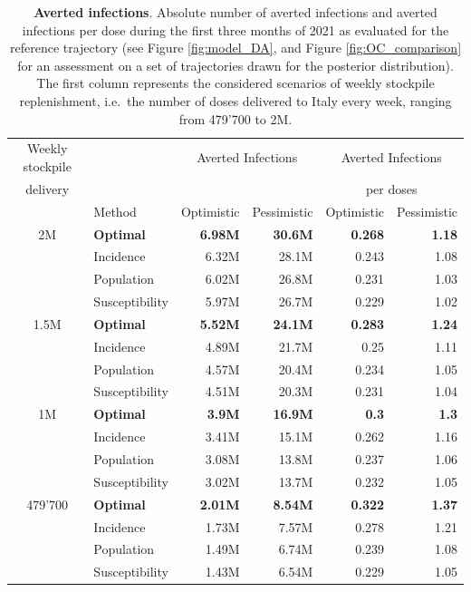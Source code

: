 \begin{table}[h!]
\centering
\begin{tabular}{clrrrr}
\toprule
Weekly stockpile& {} & \multicolumn{2}{c}{Averted Infections} & \multicolumn{2}{c}{Averted Infections} \\
delivery&    &  & & \multicolumn{2}{c}{ per doses} \\
& Method &  Optimistic & Pessimistic &     Optimistic & Pessimistic \\
\midrule
2M & \textbf{Optimal} &   \textbf{6.98M} &    \textbf{30.6M} &          \textbf{0.268} &        \textbf{1.18} \\
        & Incidence &   6.32M &    28.1M &          0.243 &        1.08 \\
        & Population &   6.02M &    26.8M &          0.231 &        1.03 \\
        & Susceptibility &   5.97M &    26.7M &          0.229 &        1.02 \\
1.5M & \textbf{Optimal} &   \textbf{5.52M} &    \textbf{24.1M} &  \textbf{        0.283} &        \textbf{1.24} \\
        & Incidence &   4.89M &    21.7M &           0.25 &        1.11 \\
        & Population &   4.57M &    20.4M &          0.234 &        1.05 \\
        & Susceptibility &   4.51M &    20.3M &          0.231 &        1.04 \\
1M & \textbf{Optimal} &    \textbf{3.9M} &    \textbf{16.9M} &            \textbf{0.3} &         \textbf{1.3} \\
        & Incidence &   3.41M &    15.1M &          0.262 &        1.16 \\
        & Population &   3.08M &    13.8M &          0.237 &        1.06 \\
        & Susceptibility &   3.02M &    13.7M &          0.232 &        1.05 \\
479'700 & \textbf{Optimal} &   \textbf{2.01M} &    \textbf{8.54M} &          \textbf{0.322} &        \textbf{1.37} \\
        & Incidence &   1.73M &    7.57M &          0.278 &        1.21 \\
        & Population &   1.49M &    6.74M &          0.239 &        1.08 \\
        & Susceptibility &   1.43M &    6.54M &          0.229 &        1.05 \\
\bottomrule
\end{tabular}
\caption{\footnotesize{\textbf{Averted infections}}. Absolute number of averted infections and averted infections per dose during the first three months of 2021 as evaluated for the reference trajectory (see Figure \ref{fig:model_DA}, and Figure \ref{fig:OC_comparison} for an assessment on a set of trajectories drawn for the posterior distribution). The first column represents the considered scenarios of weekly stockpile replenishment, i.e.~the number of doses delivered to Italy every week, ranging from 479'700 to 2M.}
\label{table:averted_abs}
\end{table}


